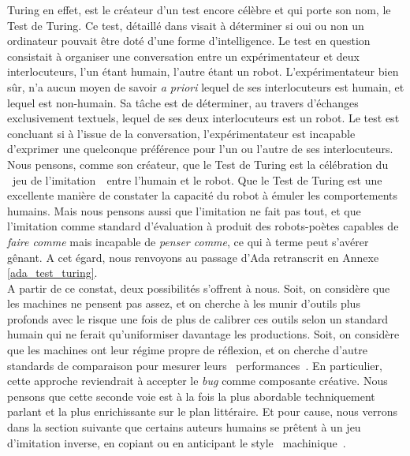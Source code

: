 \documentclass{article}
\begin{document}
					Turing en effet, est le créateur d'un test encore célèbre et qui porte son nom, le Test de Turing. Ce test, détaillé dans \autocite{turing1950} visait à déterminer si oui ou non un ordinateur pouvait être doté d'une forme d'intelligence. Le test en question consistait à organiser une conversation entre un expérimentateur et deux interlocuteurs, l'un étant humain, l'autre étant un robot. L'expérimentateur bien sûr, n'a aucun moyen de savoir \textit{a priori} lequel de ses interlocuteurs est humain, et lequel est non-humain. Sa tâche est de déterminer, au travers d'échanges exclusivement textuels, lequel de ses deux interlocuteurs est un robot. Le test est concluant si à l'issue de la conversation, l'expérimentateur est incapable d'exprimer une quelconque préférence pour l'un ou l'autre de ses interlocuteurs.\\
					
					Nous pensons, comme son créateur, que le Test de Turing est la célébration du \guillemotleft~jeu de l'imitation~\guillemotright~entre l'humain et le robot. Que le Test de Turing est une excellente manière de constater la capacité du robot à émuler les comportements humains. Mais nous pensons aussi que l'imitation ne fait pas tout, et que l'imitation comme standard d'évaluation à produit des robots-poètes capables de \textit{faire comme} mais incapable de \textit{penser comme}, ce qui à terme peut s'avérer gênant. A cet égard, nous renvoyons au passage d'Ada retranscrit en Annexe \ref{ada_test_turing}.\\
					
					A partir de ce constat, deux possibilités s'offrent à nous. Soit, on considère que les machines ne pensent pas assez, et on cherche à les munir d'outils plus profonds avec le risque une fois de plus de calibrer ces outils selon un standard humain qui ne ferait qu'uniformiser davantage les productions. Soit, on considère que les machines ont leur régime propre de réflexion, et on cherche d'autre standards de comparaison pour mesurer leurs \guillemotleft~performances~\guillemotright. En particulier, cette approche reviendrait à accepter le \textit{bug} comme composante créative. Nous pensons que cette seconde voie est à la fois la plus abordable techniquement parlant et la plus enrichissante sur le plan littéraire. Et pour cause, nous verrons dans la section suivante que certains auteurs humains se prêtent à un jeu d'imitation inverse, en copiant ou en anticipant le style \guillemotleft~machinique~\guillemotright.
					
\end{document}
